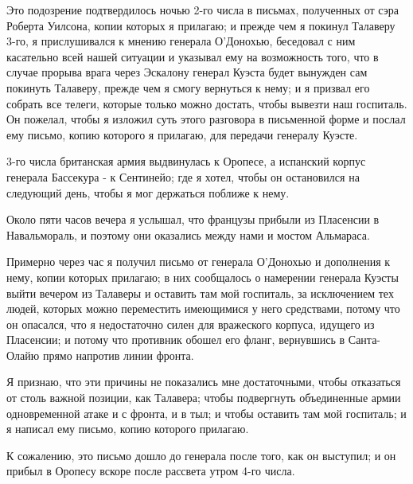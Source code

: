 \documentclass[
  oneside,
  12pt,
  titlepage]{book}
\begin{document}
Это подозрение подтвердилось ночью 2-го числа в письмах, полученных от сэра Роберта Уилсона, копии которых я прилагаю; и прежде чем я покинул Талаверу 3-го, я прислушивался к мнению генерала О'Донохью, беседовал с ним касательно всей нашей ситуации и указывал ему на возможность того, что в случае прорыва врага через Эскалону генерал Куэста будет вынужден сам покинуть Талаверу, прежде чем я смогу вернуться к нему; и я призвал его собрать все телеги, которые только можно достать, чтобы вывезти наш госпиталь. Он пожелал, чтобы я изложил суть этого разговора в письменной форме и послал ему письмо, копию которого я прилагаю, для передачи генералу Куэсте.

3-го числа британская армия выдвинулась к Оропесе, а испанский корпус генерала Бассекура - к Сентинейо; где я хотел, чтобы он остановился на следующий день, чтобы я мог держаться поближе к нему.

Около пяти часов вечера я услышал, что французы прибыли из Пласенсии в Навальмораль, и поэтому они оказались между нами и мостом Альмараса.

Примерно через час я получил письмо от генерала О'Донохью и дополнения к нему, копии которых прилагаю; в них сообщалось о намерении генерала Куэсты выйти вечером из Талаверы и оставить там мой госпиталь, за исключением тех людей, которых можно переместить имеющимися у него средствами, потому что он опасался, что я недостаточно силен для вражеского корпуса, идущего из Пласенсии; и потому что противник обошел его фланг, вернувшись в Санта-Олайю прямо напротив линии фронта.

Я признаю, что эти причины не показались мне достаточными, чтобы отказаться от столь важной позиции, как Талавера; чтобы подвергнуть объединенные армии одновременной атаке и с фронта, и в тыл; и чтобы оставить там мой госпиталь; и я написал ему письмо, копию которого прилагаю.

К сожалению, это письмо дошло до генерала после того, как он выступил; и он прибыл в Оропесу вскоре после рассвета утром 4-го числа.
\end{document}
